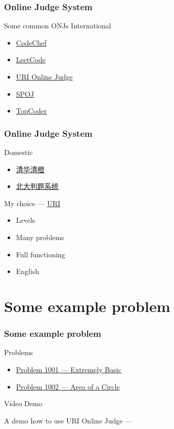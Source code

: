 \documentclass{beamer}
\begin{document}
\begin{frame}
  \frametitle{Online Judge System}
  \Huge{Some common ONJs}
  \huge International
  \begin{itemize}
  \item \href{https://www.codechef.com/}{\Large{CodeChef}}
  \item \href{https://leetcode.com/}{\Large{LeetCode}}
  \item \href{https://www.urionlinejudge.com.br/judge/en}{\Large{URI Online Judge}}
  \item \href{http://www.spoj.com/}{\Large{SPOJ}}
  \item \href{https://www.topcoder.com/}{\Large{TopCoder}}
  \end{itemize}
\end{frame}

\begin{frame}
  \frametitle{Online Judge System}
  \huge Domestic
  \begin{itemize}
  \item \href{http://www.tsinsen.com/}{\Large{清华清橙}}
  \item \href{http://poj.org/}{\Large{北大判题系统}}
  \end{itemize}
  \Huge My choice --- \href{https://www.urionlinejudge.com.br/judge/en}{URI}
  \begin{itemize}
  \item \Large{Levels}
  \item \Large{Many problems}
  \item \Large{Full functioning}
  \item \Large{English}
  \end{itemize}
\end{frame}


\section{Some example problem}
\begin{frame}
  \frametitle{Some example problem}
  \huge Problems
  \begin{itemize}
  \item \href{https://www.urionlinejudge.com.br/judge/en/problems/view/1001}{Problem 1001 --- Extremely Basic}
  \item \href{https://www.urionlinejudge.com.br/judge/en/problems/view/1002}{Problem 1002 --- Area of a Circle}
  \end{itemize}
  \huge Video Demo
  
  \Large A demo how to use URI Online Judge --- 
\end{frame}
\end{document}
